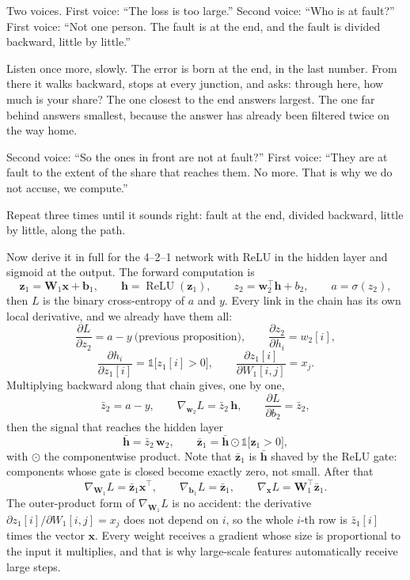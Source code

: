 \begin{bacakeras}
Two voices. First voice: ``The loss is too large.'' Second voice: ``Who is at fault?'' First
voice: ``Not one person. The fault is at the end, and the fault is divided backward, little by
little.''

Listen once more, slowly. The error is born at the end, in the last number. From there it walks
backward, stops at every junction, and asks: through here, how much is your share? The one
closest to the end answers largest. The one far behind answers smallest, because the answer has
already been filtered twice on the way home.

Second voice: ``So the ones in front are not at fault?'' First voice: ``They are at fault to the
extent of the share that reaches them. No more. That is why we do not accuse, we compute.''

Repeat three times until it sounds right: fault at the end, divided backward, little by little,
along the path.
\end{bacakeras}


Now derive it in full for the 4--2--1 network with ReLU in the hidden layer and sigmoid at the
output. The forward computation is
\[
  \mathbf{z}_{1}=\mathbf{W}_{1}\mathbf{x}+\mathbf{b}_{1},\qquad
  \mathbf{h}=\operatorname{ReLU}(\mathbf{z}_{1}),\qquad
  z_{2}=\mathbf{w}_{2}^{\top}\mathbf{h}+b_{2},\qquad
  a=\sigma(z_{2}),
\]
then $L$ is the binary cross-entropy of $a$ and $y$. Every link in the chain has its own local
derivative, and we already have them all:
\[
  \frac{\partial L}{\partial z_{2}}=a-y\ \text{(previous proposition)},\qquad
  \frac{\partial z_{2}}{\partial h_{i}}=w_{2}[i],
\]
\[
  \frac{\partial h_{i}}{\partial z_{1}[i]}=\mathbb{1}\bigl[z_{1}[i]>0\bigr],\qquad
  \frac{\partial z_{1}[i]}{\partial W_{1}[i,j]}=x_{j}.
\]
Multiplying backward along that chain gives, one by one,
\[
  \bar{z}_{2}=a-y,\qquad
  \nabla_{\mathbf{w}_{2}}L=\bar{z}_{2}\,\mathbf{h},\qquad
  \frac{\partial L}{\partial b_{2}}=\bar{z}_{2},
\]
then the signal that reaches the hidden layer
\[
  \bar{\mathbf{h}}=\bar{z}_{2}\,\mathbf{w}_{2},
  \qquad
  \bar{\mathbf{z}}_{1}=\bar{\mathbf{h}}\odot\mathbb{1}\bigl[\mathbf{z}_{1}>0\bigr],
\]
with $\odot$ the componentwise product. Note that $\bar{\mathbf{z}}_{1}$ is $\bar{\mathbf{h}}$
shaved by the ReLU gate: components whose gate is closed become exactly zero, not small. After
that
\[
  \nabla_{\mathbf{W}_{1}}L=\bar{\mathbf{z}}_{1}\mathbf{x}^{\top},\qquad
  \nabla_{\mathbf{b}_{1}}L=\bar{\mathbf{z}}_{1},\qquad
  \nabla_{\mathbf{x}}L=\mathbf{W}_{1}^{\top}\bar{\mathbf{z}}_{1}.
\]
The outer-product form of $\nabla_{\mathbf{W}_{1}}L$ is no accident: the derivative
$\partial z_{1}[i]/\partial W_{1}[i,j]=x_{j}$ does not depend on $i$, so the whole $i$-th row is
$\bar{z}_{1}[i]$ times the vector $\mathbf{x}$. Every weight receives a gradient whose size is
proportional to the input it multiplies, and that is why large-scale features automatically
receive large steps.

